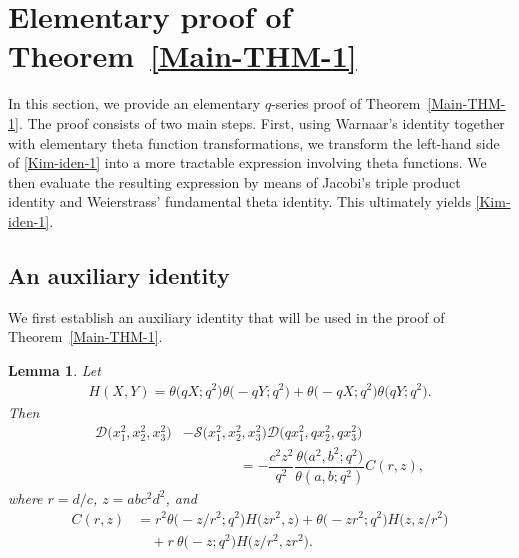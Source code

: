 \documentclass[12pt,reqno]{amsart}
\numberwithin{equation}{section}
\theoremstyle{plain}
\newtheorem{lemma}[theorem]{Lemma}
\theoremstyle{definition}
\begin{document}
\section{Elementary proof of Theorem~\ref{Main-THM-1}}\label{Sect:EP-1}

In this section, we provide an elementary $q$-series proof of Theorem~\ref{Main-THM-1}.
The proof consists of two main steps. First, using Warnaar's identity together with
elementary theta function transformations, we transform the left-hand side of
\eqref{Kim-iden-1} into a more tractable expression involving theta functions. We then
evaluate the resulting expression by means of Jacobi's triple product identity and
Weierstrass' fundamental theta identity. This ultimately yields \eqref{Kim-iden-1}.


\subsection{An auxiliary identity}\label{Subs:FS}
We first establish an auxiliary identity that will be used in the proof of
Theorem~\ref{Main-THM-1}.

\begin{lemma}\label{Fund-Lem-1}
Let
\begin{align}
H(X,Y)=\theta\big(qX;q^2\big)\theta\big({-}qY;q^2\big)+\theta\big({-}qX;q^2)
\theta\big(qY;q^2\big).\label{Def-H}
\end{align}
Then
\begin{align}
\mathscr{D}\big(x_1^2,x_2^2,x_3^2\big) &-\mathscr{S}\big(x_1^2,x_2^2,x_3^2\big)
\mathscr{D}\big(qx_1^2,qx_2^2,qx_3^2\big)\nonumber\\
 &\qquad\qquad=-\dfrac{c^2z^2}{q^2}\dfrac{\theta\big(a^2,b^2;q^2\big)}{\theta(a,b;q^2)}
C(r,z),\label{Fund-iden-1}
\end{align}
where $r=d/c$, $z=abc^2d^2$, and
\begin{align}
C(r,z) &=r^2\theta\big({-}z/r^2;q^2\big)H\big(zr^2,z\big)+\theta\big({-}zr^2;q^2\big)
H\big(z,z/r^2\big)\nonumber\\
 &\quad+r\!\:\theta\big({-}z;q^2\big)H\big(z/r^2,zr^2\big).\label{Def-C}
\end{align}
\end{lemma}
\end{document}

